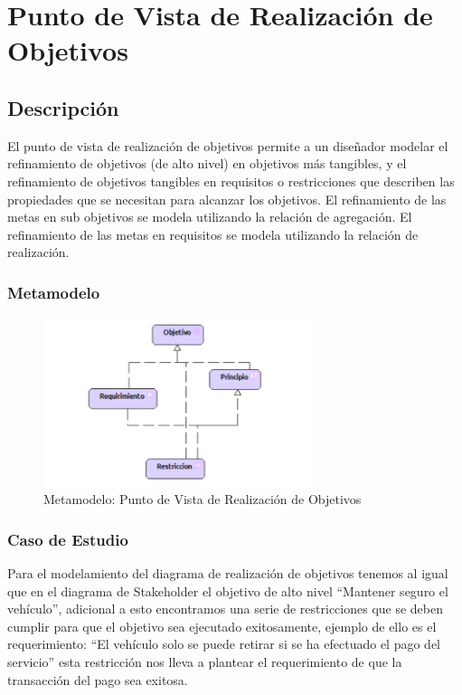 \section{Punto de Vista de Realización de Objetivos}
\subsection{Descripción}
El punto de vista de realización de objetivos permite a un diseñador modelar el refinamiento de objetivos (de alto nivel) en objetivos más tangibles, y el refinamiento de objetivos tangibles en requisitos o restricciones que describen las propiedades que se necesitan para alcanzar los objetivos. El refinamiento de las metas en sub objetivos se modela utilizando la relación de agregación. El refinamiento de las metas en requisitos se modela utilizando la relación de realización. 
\subsubsection{Metamodelo}
\begin{figure}[h]
	\centering
	\includegraphics[width=0.7\textwidth]{imagenes/Metamodelos/Motivacion/meta_realizacion_objetivos.pdf}
	\caption{Metamodelo: Punto de Vista de Realización de Objetivos}
	\label{fig:gap_analysis}
\end{figure}

\subsubsection{Caso de Estudio}
Para el modelamiento del diagrama de realización de objetivos tenemos al igual que en el diagrama de Stakeholder el objetivo de alto nivel “Mantener seguro el vehículo”, adicional a esto encontramos una serie de restricciones que se deben cumplir para que el objetivo sea ejecutado exitosamente, ejemplo de ello es el requerimiento: “El vehículo solo se puede retirar si se ha efectuado el pago del servicio” esta restricción nos lleva a plantear el requerimiento de que la transacción del pago sea exitosa.

